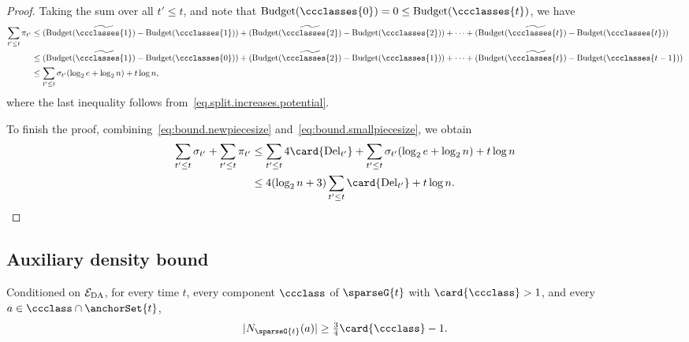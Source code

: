 \begin{proof}
    Taking the sum over all $ t'\leq t $, and note that $ \potential{\ccclasses{0}} = 0 \leq \potential{\ccclasses{t}} $, we have
    { \small
    \begin{align}
        \sum_{t'\leq t} \smallpiecesize{t'} &\leq (\potential{\widetilde{\ccclasses{1}}} - \potential{\ccclasses{1}}) + (\potential{\widetilde{\ccclasses{2}}} - \potential{\ccclasses{2}}) + \dots + (\potential{\widetilde{\ccclasses{t}}} - \potential{\ccclasses{t}}) \nonumber \\
                                            &\leq (\potential{\widetilde{\ccclasses{1}}} - \potential{\ccclasses{0}}) + (\potential{\widetilde{\ccclasses{2}}} - \potential{\ccclasses{1}}) + \dots + (\potential{\widetilde{\ccclasses{t}}} - \potential{\ccclasses{t-1}}) \nonumber \\
                                            &\leq \sum_{t'\leq t} \newpiecesize{t'}(\log_{2}e + \log_{2}n) + t\log n, \label{eq:bound.smallpiecesize}
    \end{align} 
    }
    where the last inequality follows from~\eqref{eq.split.increases.potential}.

    To finish the proof, combining~\eqref{eq:bound.newpiecesize} and~\eqref{eq:bound.smallpiecesize}, we obtain
    \begin{align}
        \sum_{t'\leq t} \newpiecesize{t'} + \sum_{t'\leq t}\smallpiecesize{t'} &\leq \sum_{t'\leq t} 4\card{\delt{t'}} + \sum_{t'\leq t} \newpiecesize{t'}(\log_{2}e + \log_{2}n) + t\log n \nonumber \\
                                                                                  &\leq 4(\log_{2}n + 3)\sum_{t'\leq t}\card{\delt{t'}} + t\log n. \nonumber
    \end{align}
\end{proof}


\subsection{Auxiliary density bound}
\label{sub:auxiliary_lemmas_from_}

\begin{lemma}
\label{lem:ccclass.is.dense}
Conditioned on $ \mathcal{E}_{\rm DA} $, for every time $ t $, every component $ \ccclass $ of $ \sparseG{t} $ with $ \card{\ccclass}>1 $, and every $ a\in \ccclass\cap\anchorSet{t} $,
\[
  |\openN{\sparseG{t}}{a}|\ge\tfrac34\card{\ccclass}-1.
\]
\end{lemma}


